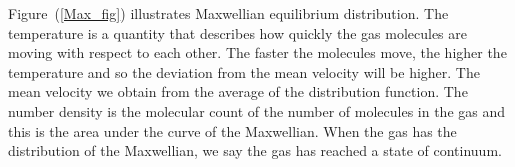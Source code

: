 \FloatBarrier
%
Figure~(\ref{Max_fig}) illustrates Maxwellian equilibrium distribution. The temperature is a quantity that describes how quickly the gas molecules are moving with respect to each other. The faster the molecules move, the higher the temperature and so the deviation from the mean velocity will be higher. The mean velocity we obtain from the average of the distribution function. The number density is the molecular count of the number of molecules in the gas and this is the area under the curve of the Maxwellian. When the gas has the distribution of the Maxwellian, we say the gas has reached a state of continuum.
